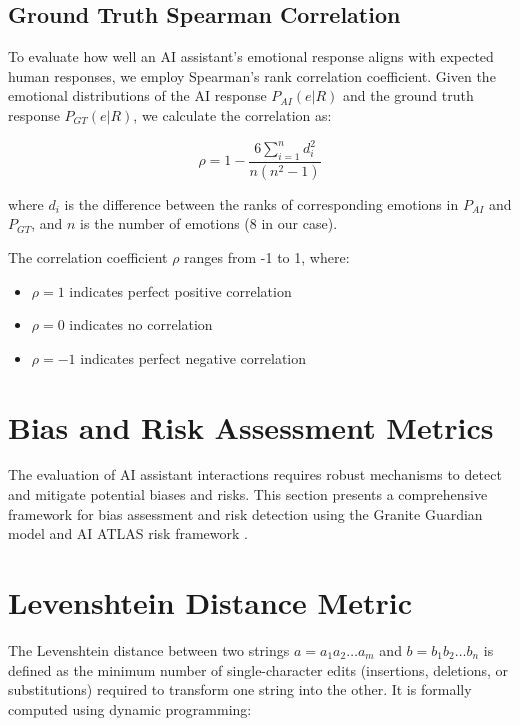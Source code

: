 \documentclass[12pt]{article}
\begin{document}
\subsection{Ground Truth Spearman Correlation}

To evaluate how well an AI assistant's emotional response aligns with expected human responses, we employ Spearman's rank correlation coefficient. Given the emotional distributions of the AI response $P_{AI}(e|R)$ and the ground truth response $P_{GT}(e|R)$, we calculate the correlation as:

\begin{equation}
    \rho = 1 - \frac{6\sum_{i=1}^{n} d_i^2}{n(n^2-1)}
\end{equation}

where $d_i$ is the difference between the ranks of corresponding emotions in $P_{AI}$ and $P_{GT}$, and $n$ is the number of emotions (8 in our case).

The correlation coefficient $\rho$ ranges from -1 to 1, where:
\begin{itemize}
    \item $\rho = 1$ indicates perfect positive correlation
    \item $\rho = 0$ indicates no correlation
    \item $\rho = -1$ indicates perfect negative correlation
\end{itemize}

\section{Bias and Risk Assessment Metrics}

The evaluation of AI assistant interactions requires robust mechanisms to detect and mitigate potential biases and risks. This section presents a comprehensive framework for bias assessment and risk detection using the Granite Guardian model \cite{ibm2024granite} and AI ATLAS risk framework \cite{ibm2024atlas}.

\section{Levenshtein Distance Metric}

The Levenshtein distance between two strings \( a = a_1 a_2 \dots a_m \) and \( b = b_1 b_2 \dots b_n \) is defined as the minimum number of single-character edits (insertions, deletions, or substitutions) required to transform one string into the other. It is formally computed using dynamic programming:
\end{document}
